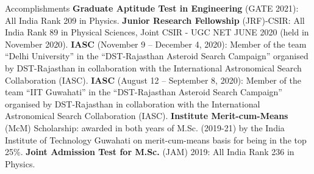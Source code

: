 \begin{rubric}{Accomplishments}
\entry*[] \textbf{Graduate Aptitude Test in Engineering} (GATE 2021): All India Rank 209 in Physics.
%
\entry*[] \textbf{Junior Research Fellowship} (JRF)-CSIR: All India Rank 89 in Physical Sciences, Joint CSIR - UGC NET JUNE 2020 (held in November 2020).
%
\entry*[] \textbf{IASC} (November 9 – December 4, 2020): Member of the team ``Delhi University'' in the ``DST-Rajasthan Asteroid Search Campaign'' organised by DST-Rajasthan in collaboration with the International Astronomical Search Collaboration (IASC).
%
\entry*[] \textbf{IASC} (August 12 – September 8, 2020): Member of the team ``IIT Guwahati'' in the “DST-Rajasthan Asteroid Search Campaign” organised by DST-Rajasthan in collaboration with the International Astronomical Search Collaboration (IASC).
%
\entry*[] \textbf{Institute Merit-cum-Means} (McM) Scholarship: awarded in both years of M.Sc. (2019-21) by the India Institute of Technology Guwahati on merit-cum-means basis for being in the top 25\%.
%
\entry*[] \textbf{Joint Admission Test for M.Sc.} (JAM) 2019: All India Rank 236 in Physics.


\end{rubric}
